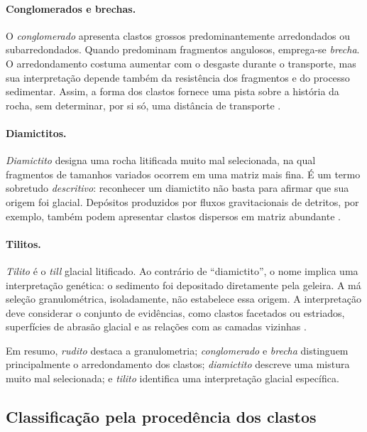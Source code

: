 \documentclass[a4paper,12pt]{article}
\theoremstyle{definition}
\theoremstyle{definition}
\theoremstyle{definition}
\begin{document}
\paragraph{Conglomerados e brechas.}
O \emph{conglomerado} apresenta clastos grossos predominantemente
arredondados ou subarredondados. Quando predominam fragmentos
angulosos, emprega-se \emph{brecha}. O arredondamento costuma
aumentar com o desgaste durante o transporte, mas sua interpretação
depende também da resistência dos fragmentos e do processo
sedimentar. Assim, a forma dos clastos fornece uma pista sobre a
história da rocha, sem determinar, por si só, uma distância de
transporte \autocite{uspconglomerado,kgsclassificacao}.

\paragraph{Diamictitos.}
\emph{Diamictito} designa uma rocha litificada muito mal selecionada,
na qual fragmentos de tamanhos variados ocorrem em uma matriz
mais fina. É um termo sobretudo \emph{descritivo}: reconhecer um
diamictito não basta para afirmar que sua origem foi glacial.
Depósitos produzidos por fluxos gravitacionais de detritos, por
exemplo, também podem apresentar clastos dispersos em matriz
abundante \autocite{mit2007siliciclastic}.

\paragraph{Tilitos.}
\emph{Tilito} é o \emph{till} glacial litificado. Ao contrário de
``diamictito'', o nome implica uma interpretação genética: o
sedimento foi depositado diretamente pela geleira. A má seleção
granulométrica, isoladamente, não estabelece essa origem. A
interpretação deve considerar o conjunto de evidências, como
clastos facetados ou estriados, superfícies de abrasão glacial e
as relações com as camadas vizinhas
\autocite{kgsclassificacao,trosdtorf2005glacial}.

Em resumo, \emph{rudito} destaca a granulometria;
\emph{conglomerado} e \emph{brecha} distinguem principalmente o
arredondamento dos clastos; \emph{diamictito} descreve uma mistura
muito mal selecionada; e \emph{tilito} identifica uma interpretação
glacial específica.

\subsection{Classificação pela procedência dos clastos}
\end{document}
